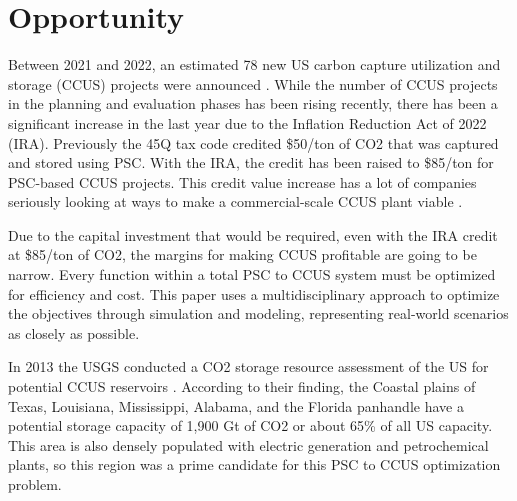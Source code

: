 \documentclass[balance,upint,subscriptcorrection,varvw,mathalfa=cal=boondoxo,spanish,french,vietnamese,russian,greek,pdf-a,colorlinks]{asmeconf}
\begin{document}
\section{Opportunity}
Between 2021 and 2022, an estimated 78 new US carbon capture utilization and storage (CCUS) projects were announced \cite{CCSProjects2023}. While the number of CCUS projects in the planning and evaluation phases has been rising recently, there has been a significant increase in the last year due to the Inflation Reduction Act of 2022 (IRA). Previously the 45Q tax code credited \$50/ton of CO2 that was captured and stored using PSC. With the IRA, the credit has been raised to \$85/ton for PSC-based CCUS projects. This credit value increase has a lot of companies seriously looking at ways to make a commercial-scale CCUS plant viable \cite{IRA2022}. 

Due to the capital investment that would be required, even with the IRA credit at \$85/ton of CO2, the margins for making CCUS profitable are going to be narrow. Every function within a total PSC to CCUS system must be optimized for efficiency and cost. This paper uses a multidisciplinary approach to optimize the objectives through simulation and modeling, representing real-world scenarios as closely as possible. 

In 2013 the USGS conducted a CO2 storage resource assessment of the US for potential CCUS reservoirs \cite{USGS2013}. According to their finding, the Coastal plains of Texas, Louisiana, Mississippi, Alabama, and the Florida panhandle have a potential storage capacity of 1,900 Gt of CO2 or about 65\% of all US capacity. This area is also densely populated with electric generation and petrochemical plants, so this region was a prime candidate for this PSC to CCUS optimization problem.
\end{document}
